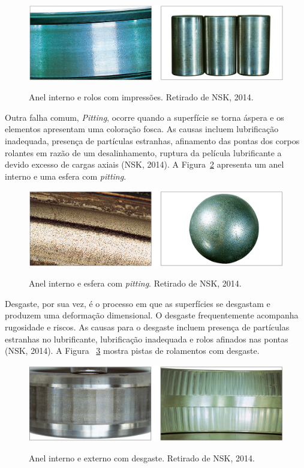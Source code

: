 \documentclass[
	12pt,				
	oneside,			
	a4paper,			
	english,			
	brazil,			
	]{abntex2ppgsi}
\begin{document}
\begin{figure}[H]
\centering
\caption {Anel interno e rolos com impressões. Retirado de NSK, 2014.}
\includegraphics[width=\textwidth,height=\textheight,keepaspectratio]{impressoes_nsk}
\label{impressoes_nsk}
\end{figure}

Outra falha comum, \textit{Pitting}, ocorre quando a superfície se torna áspera e os elementos apresentam uma coloração fosca. As causas incluem lubrificação inadequada, presença de partículas estranhas, afinamento das pontas dos corpos rolantes em razão de um desalinhamento, ruptura da película lubrificante a devido excesso de cargas axiais (NSK, 2014). A Figura~\ref{pitting_nsk} apresenta um anel interno e uma esfera com \textit{pitting}.

\begin{figure}[H]
\centering
\caption {Anel interno e esfera com \textit{pitting}. Retirado de NSK, 2014.}
\includegraphics[width=\textwidth,height=\textheight,keepaspectratio]{pitting_nsk}
\label{pitting_nsk}
\end{figure}

Desgaste, por sua vez, é o processo em que as superfícies se desgastam e produzem uma deformação dimensional. O desgaste frequentemente acompanha rugosidade e riscos. As causas para o desgaste incluem presença de partículas estranhas no lubrificante, lubrificação inadequada e rolos afinados nas pontas (NSK, 2014). A Figura ~\ref{desgaste_nsk} mostra pistas de rolamentos com desgaste.

\begin{figure}[H]
\centering
\caption {Anel interno e externo com desgaste. Retirado de NSK, 2014.}
\includegraphics[width=\textwidth,height=\textheight,keepaspectratio]{desgaste_nsk}
\label{desgaste_nsk}
\end{figure}
\end{document}
